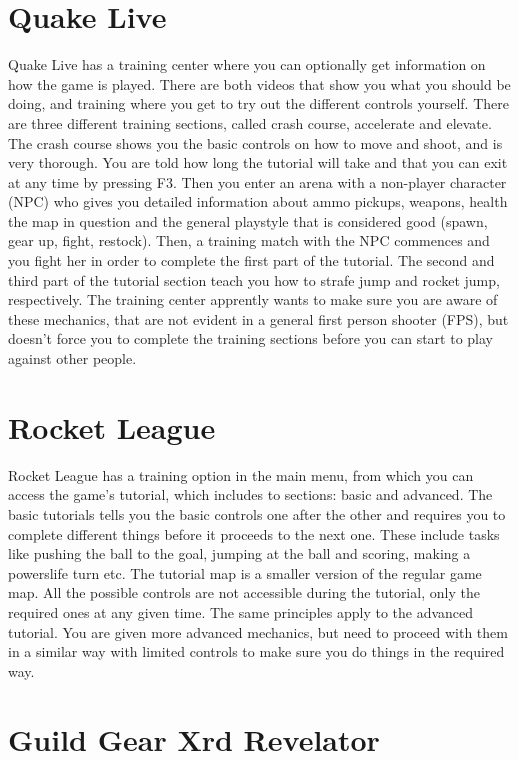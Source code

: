 \section{Quake Live}

Quake Live has a training center where you can optionally get information on how the game is played. There are both videos that show you what you should be doing, and training where you get to try out the different controls yourself. There are three different training sections, called crash course, accelerate and elevate. The crash course shows you the basic controls on how to move and shoot, and is very thorough. You are told how long the tutorial will take and that you can exit at any time by pressing F3. Then you enter an arena with a non-player character (NPC) who gives you detailed information about ammo pickups, weapons, health the map in question and the general playstyle that is considered good (spawn, gear up, fight, restock). Then, a training match with the NPC commences and you fight her in order to complete the first part of the tutorial. The second and third part of the tutorial section teach you how to strafe jump and rocket jump, respectively. The training center apprently wants to make sure you are aware of these mechanics, that are not evident in a general first person shooter (FPS), but doesn't force you to complete the training sections before you can start to play against other people.

\section{Rocket League}

Rocket League has a training option in the main menu, from which you can access the game's tutorial, which includes to sections: basic and advanced.
The basic tutorials tells you the basic controls one after the other and requires you to complete different things before it proceeds to the next one. These include tasks like pushing the ball to the goal, jumping at the ball and scoring, making a powerslife turn etc. The tutorial map is a smaller version of the regular game map. All the possible controls are not accessible during the tutorial, only the required ones at any given time.
The same principles apply to the advanced tutorial. You are given more advanced mechanics, but need to proceed with them in a similar way with limited controls to make sure you do things in the required way.

\section{Guild Gear Xrd Revelator}

